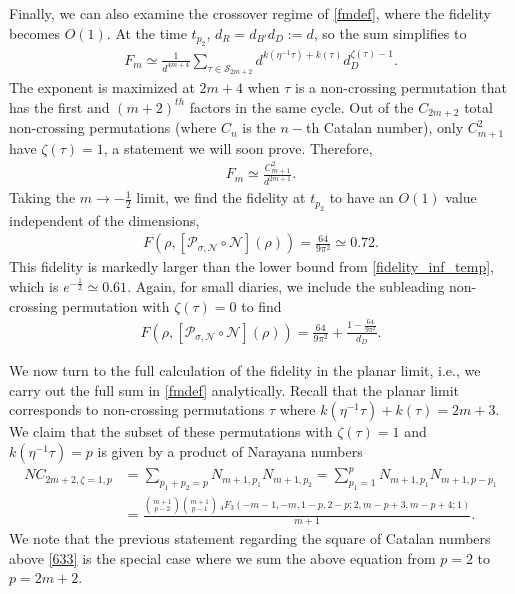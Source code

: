 \documentclass[a4paper,11pt]{article}
\begin{document}
\begin{enumerate}
Finally, we can also examine the crossover regime of \eqref{fmdef}, where the fidelity becomes $O(1)$. At the time $t_{p_2}$, $d_R = d_{B'} d_D := d$, so the sum simplifies to 
\begin{align}
 F_m \simeq \frac{1}{d^{4m+4}} \sum_{\tau \in \mathcal{S}_{2m +2}} d^{k(\eta^{-1} \tau) + k(\tau) }d_D^{\zeta(\tau)-1}.
\end{align}
The exponent is maximized at $2m+4$ when $\tau$ is a non-crossing permutation that has the first and $(m+2)^{th}$ factors in the same cycle. Out of the $C_{2m + 2}$ total non-crossing permutations (where $C_n$ is the $n-$th Catalan number), only $C_{m + 1}^2$ have $\zeta(\tau) = 1$, a statement we will soon prove. Therefore,
\begin{align}
 F_m \simeq \frac{C_{m+1}^2}{d^{2m+1}}. \label{633}
\end{align}
Taking the $m\rightarrow -\frac{1}{2}$ limit, we find the fidelity at $t_{p_2}$ to have an $O(1)$ value independent of the dimensions, 
\begin{align}
 F(\rho , [\mathcal{P}_{\sigma,\mathcal{N}}\circ \mathcal{N}](\rho)) = \frac{64}{9\pi^2} \simeq 0.72.
\end{align}
This fidelity is markedly larger than the lower bound from \eqref{fidelity_inf_temp}, which is $e^{-\frac{1}{2}} \simeq0.61$.
Again, for small diaries, we include the subleading non-crossing permutation with $\zeta(\tau) = 0$ to find
\begin{align}
 F(\rho , [\mathcal{P}_{\sigma,\mathcal{N}}\circ \mathcal{N}](\rho)) = \frac{64}{9\pi^2}+ \frac{1-\frac{64}{9\pi^2}}{d_D}.
\end{align}

We now turn to the full calculation of  the fidelity in the planar limit, i.e., we carry out the full sum in \eqref{fmdef} analytically. 
Recall that the planar limit corresponds to non-crossing permutations $\tau$ where $k(\eta^{-1}\tau)+k(\tau) = 2m +3$. We claim that the subset of these permutations with $\zeta(\tau) = 1$ and $k(\eta^{-1}\tau) = p$ is given by a product of Narayana numbers
\begin{align}
	NC_{2m+2, \zeta = 1,p} &= \sum_{p_1 + p _2= p} N_{m+1,p_1}N_{m+1,p_2} = \sum_{p_1= 1}^{p} N_{m+1,p_1}N_{m+1,p-p_1}
	\nonumber
	\\
	&=\frac{\binom{m+1}{p-2} \binom{m+1}{p-1} \,
  _4F_3(-m-1,-m,1-p,2-p;2,m-p+3,m-p+4;1)}{m+1} .
  \label{nara_prod}
\end{align}
We note that the previous statement regarding the square of Catalan numbers above \eqref{633} is the special case where we sum the above equation from $p = 2$ to $ p = 2m+2$.


\end{enumerate}
\end{document}

